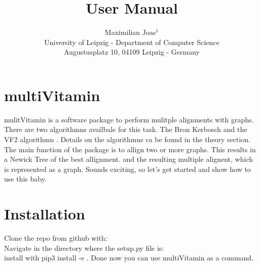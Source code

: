 \documentclass{SeminarV2}
\begin{document}
\title{User Manual}

\author{Maximilian Joas$^1$
%
%
\vspace{.3cm}\\
%
University of Leipzig  - Department of Computer Science \\
Augustusplatz 10, 04109 Leipzig  - Germany\\}

%


\maketitle

\begin{abstract}


\end{abstract}

\section{multiVitamin}
mulitVitamin is a software package to perform mulitple alignments with graphs.
There are two algorithmns availbale for this task. The Bron Kerbosch \cite{}
and the VF2 algorithmn \cite{}. Details on the algorithmns ca be found in the
theory section.\\
The main function of the package is to allign two or more graphs. This results
in a Newick Tree of the best allignment. and the resulting multiple alignent, which
is represented as a graph.
\cite{}  Sounds exciting, so let's
get started and show how to use this baby.
\section{Installation}

Clone the repo from github with: \\
Navigate in the directory where the setup.py file is: \\
install with pip3 install -e .
Done now you can use multiVitamin as a command.
\end{document}
